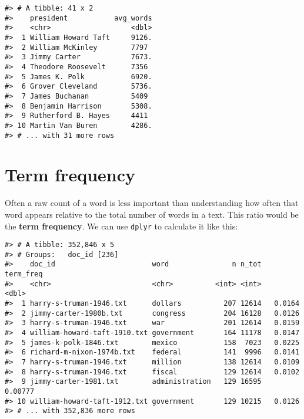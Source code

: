 \documentclass[]{book}
\newenvironment{Shaded}{\begin{snugshade}}{\end{snugshade}}
\newcommand{\CommentTok}[1]{\textcolor[rgb]{0.56,0.35,0.01}{\textit{#1}}}
\newcommand{\DataTypeTok}[1]{\textcolor[rgb]{0.13,0.29,0.53}{#1}}
\newcommand{\KeywordTok}[1]{\textcolor[rgb]{0.13,0.29,0.53}{\textbf{#1}}}
\newcommand{\NormalTok}[1]{#1}
\newcommand{\OperatorTok}[1]{\textcolor[rgb]{0.81,0.36,0.00}{\textbf{#1}}}
\newcommand{\StringTok}[1]{\textcolor[rgb]{0.31,0.60,0.02}{#1}}
\begin{document}
\begin{verbatim}
#> # A tibble: 41 x 2
#>    president           avg_words
#>    <chr>                   <dbl>
#>  1 William Howard Taft     9126.
#>  2 William McKinley        7797 
#>  3 Jimmy Carter            7673.
#>  4 Theodore Roosevelt      7356 
#>  5 James K. Polk           6920.
#>  6 Grover Cleveland        5736.
#>  7 James Buchanan          5409 
#>  8 Benjamin Harrison       5308.
#>  9 Rutherford B. Hayes     4411 
#> 10 Martin Van Buren        4286.
#> # ... with 31 more rows
\end{verbatim}

\hypertarget{term-frequency}{%
\section{Term frequency}\label{term-frequency}}

Often a raw count of a word is less important than understanding how often that word appears relative to the total number of words in a text. This ratio would be the \textbf{term frequency}. We can use \texttt{dplyr} to calculate it like this:

\begin{Shaded}
\end{Shaded}

\begin{verbatim}
#> # A tibble: 352,846 x 5
#> # Groups:   doc_id [236]
#>    doc_id                       word               n n_tot term_freq
#>    <chr>                        <chr>          <int> <int>     <dbl>
#>  1 harry-s-truman-1946.txt      dollars          207 12614   0.0164 
#>  2 jimmy-carter-1980b.txt       congress         204 16128   0.0126 
#>  3 harry-s-truman-1946.txt      war              201 12614   0.0159 
#>  4 william-howard-taft-1910.txt government       164 11178   0.0147 
#>  5 james-k-polk-1846.txt        mexico           158  7023   0.0225 
#>  6 richard-m-nixon-1974b.txt    federal          141  9996   0.0141 
#>  7 harry-s-truman-1946.txt      million          138 12614   0.0109 
#>  8 harry-s-truman-1946.txt      fiscal           129 12614   0.0102 
#>  9 jimmy-carter-1981.txt        administration   129 16595   0.00777
#> 10 william-howard-taft-1912.txt government       129 10215   0.0126 
#> # ... with 352,836 more rows
\end{verbatim}
\end{document}
